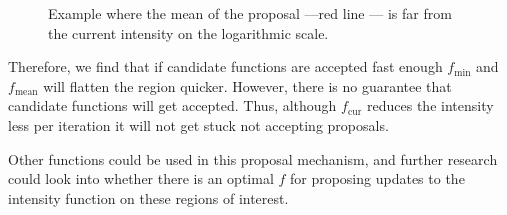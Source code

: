 \documentclass[oneside, 12 pt]{book}
\begin{document}
   \begin{figure}[t]
   \hrulefill
   \begin{center} 
    \end{center}     
    \caption{Example where the mean of the proposal ---red line --- is far from  the current intensity on the logarithmic scale. }
    \label{fig:badCandidate}
    \hrulefill
    \end{figure}
    

  Therefore, we find that if candidate functions are accepted fast enough $f_{\mathrm{min}}$ and $f_{\mathrm{mean}}$ will flatten the region quicker. However, there is no guarantee that candidate functions will get accepted.   Thus, although $f_\mathrm{cur}$ reduces the intensity less per iteration it  will not get stuck not accepting proposals. 
  
  Other functions could be used in this proposal mechanism, and further research could look into whether there is an optimal $f$ for proposing updates to the intensity function on these regions of interest.   
  
  
\end{document}

